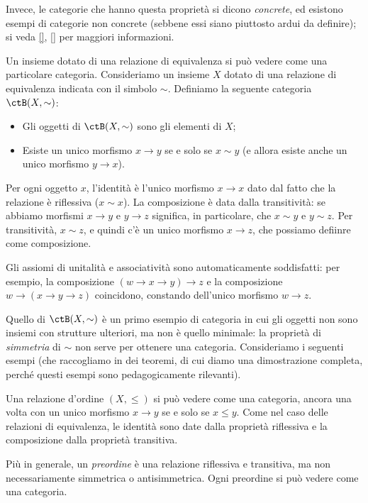 Invece, le categorie che hanno questa proprietà si dicono \emph{concrete}, ed esistono esempi di categorie non concrete (sebbene essi siano piuttosto ardui da definire); si veda \ref{}, \ref{} per maggiori informazioni.
\begin{example}\label{ex_cat_rel_equiv}
	Un insieme dotato di una relazione di equivalenza si può vedere come una particolare categoria. Consideriamo un insieme \(X\) dotato di una relazione di equivalenza indicata con il simbolo \(\sim\).
	Definiamo la seguente categoria \(\ctB(X,\sim)\):
	\begin{itemize}
		\item Gli oggetti di \(\ctB(X,\sim)\) sono gli elementi di \(X\);
		\item Esiste un unico morfismo \(x\to y\) se e solo se \(x\sim y\) (e allora esiste anche un unico morfismo \(y\to x\)).
	\end{itemize}
	Per ogni oggetto \(x\), l'identità è l'unico morfismo \(x\to x\) dato dal fatto che la relazione è riflessiva (\(x\sim x\)).
	La composizione è data dalla transitività: se abbiamo morfismi \(x\to y\) e \(y\to z\) significa, in particolare, che \(x\sim y\) e \(y\sim z\). Per transitività, \(x\sim z\), e quindi c'è un unico morfismo \(x\to z\), che possiamo defiinre come composizione.

	Gli assiomi di unitalità e associatività sono automaticamente soddisfatti: per esempio, la composizione \((w\to x\to y)\to z\) e la composizione \(w\to (x\to y\to z)\) coincidono, constando dell'unico morfismo \(w\to z\).
\end{example}
Quello di \(\ctB(X,\sim)\) è un primo esempio di categoria in cui gli oggetti non sono insiemi con strutture ulteriori, ma non è quello minimale: la proprietà di \emph{simmetria} di \(\sim\) non serve per ottenere una categoria. Consideriamo i seguenti esempi (che raccogliamo in dei teoremi, di cui diamo una dimostrazione completa, perché questi esempi sono pedagogicamente rilevanti).
\begin{theorem}\label{pos_sonocat}
\end{theorem}
\begin{theorem}\label{ex_cat_rel_ord}
\end{theorem}
\begin{examples}\label{ord_sonocat}
	Una relazione d'ordine \((X,\le)\) si può vedere come una categoria, ancora una volta con un unico morfismo \(x\to y\) se e solo se \(x\le y\). Come nel caso delle relazioni di equivalenza, le identità sono date dalla proprietà riflessiva e la composizione dalla proprietà transitiva.

	Più in generale, un \emph{preordine} è una relazione riflessiva e transitiva, ma non necessariamente simmetrica o antisimmetrica. Ogni preordine si può vedere come una categoria.
\end{examples}
